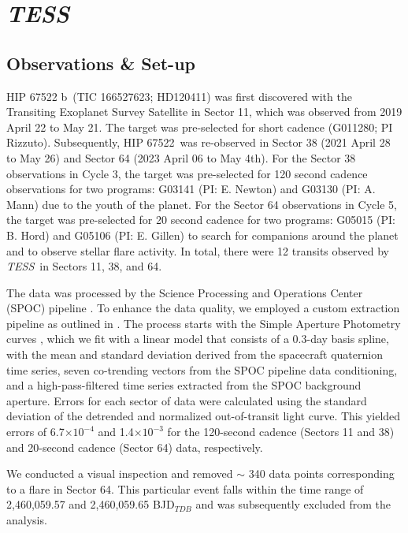 \documentclass[twocolumn]{aastex63} %
\newcommand{\tess}{\textit{TESS}}
\newcommand{\plname}{HIP 67522 b}
\newcommand{\starname}{HIP 67522}
\begin{document}
\section{\tess\,} \label{sec:tess}


\subsection{Observations \& Set-up}
\plname\ (TIC 166527623; HD120411) was first discovered with the Transiting Exoplanet Survey Satellite \citep[\tess\,;][]{Ricker2014} in Sector 11, which was observed from 2019 April 22 to May 21. The target was pre-selected for short cadence (G011280; PI Rizzuto). Subsequently, \starname\,  was re-observed in Sector 38 (2021 April 28 to May 26) and Sector 64 (2023 April 06 to May 4th). For the Sector 38 observations in Cycle 3, the target was pre-selected for 120 second cadence observations for two programs: G03141 (PI: E. Newton) and G03130 (PI: A. Mann) due to the youth of the planet. For the Sector 64 observations in Cycle 5, the target was pre-selected for 20 second cadence for two programs: G05015 (PI: B. Hord) and G05106 (PI: E. Gillen) to search for companions around the planet and to observe stellar flare activity. In total, there were 12 transits observed by \tess\, in Sectors 11, 38, and 64. 


The data was processed by the Science Processing and Operations Center (SPOC) pipeline \citep{jenkins2016tess}. To enhance the data quality, we employed a custom extraction pipeline as outlined in \citet{vanderburg2019tess}. The process starts with the Simple Aperture Photometry curves \citep[SAP;][]{Twicken2010}, which we fit with a linear model that consists of a 0.3-day basis spline, with the mean and standard deviation derived from the spacecraft quaternion time series, seven co-trending vectors from the SPOC pipeline data conditioning, and a high-pass-filtered time series extracted from the SPOC background aperture. Errors for each sector of data were calculated using the standard deviation of the detrended and normalized out-of-transit light curve. This yielded errors of 6.7$\times10^{-4}$ and 1.4$\times10^{-3}$ for the 120-second cadence (Sectors 11 and 38) and 20-second cadence (Sector 64) data, respectively.

We conducted a visual inspection and removed $\sim$ 340 data points corresponding to a flare in Sector 64. This particular event falls within the time range of 2,460,059.57 and 2,460,059.65 BJD$_{TDB}$ and was subsequently excluded from the analysis.
\end{document}
